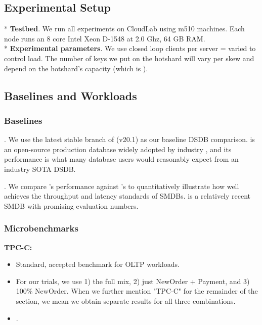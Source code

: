 \subsection{Experimental Setup}

* \textbf{Testbed}. We run all experiments on CloudLab \cite{cloudlab} using m510 machines. Each node runs an 8 core Intel Xeon D-1548 at 2.0 Ghz, 64 GB RAM.\\
* \textbf{Experimental parameters}. We use closed loop clients per server = varied to control load. The number of keys we put on the hotshard will vary per skew and depend on the hotshard's capacity (which is ).\\

\subsection{Baselines and Workloads}

\subsubsection{Baselines}
\textbf{\dsdb{}}. We use the latest stable branch of \dsdb{} (v20.1) as our baseline DSDB comparison. \dsdb{} is an open-source production database widely adopted by industry , and its performance is what many database users would reasonably expect from an industry SOTA DSDB.

\textbf{\smdb{}}. We compare \name{}'s performance against \smdb{}'s to quantitatively illustrate how well \name{} achieves the throughput and latency standards of SMDBs. \smdb{} is a relatively recent SMDB with promising evaluation numbers.

\subsubsection{Microbenchmarks}

\textbf{TPC-C:}\\
\begin{itemize}
    \item Standard, accepted benchmark for OLTP workloads.
    \item For our trials, we use 1) the full mix, 2) just NewOrder + Payment, and 3) 100\% NewOrder. When we further mention "TPC-C" for the remainder of the section, we mean we obtain separate results for all three combinations.
    \item {}.
\end{itemize}

